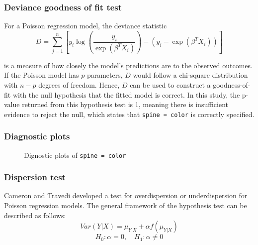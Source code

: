 \documentclass[a4paper, 12pt]{article}
\begin{document}
\subsubsection{Deviance goodness of fit test}
\noindent For a Poisson regression model, the deviance statistic 
$$ D = \sum_{j=1}^{n}[y_i\log(\frac{y_i}{\exp(\beta^T{X_i})}) - (y_i - \exp(\beta^T{X_i}))] $$

\noindent is a measure of how closely the model's predictions are to the observed outcomes. If the Poisson model has $p$ parameters, $D$ would follow a chi-square distribution with $n-p$ degrees of freedom. Hence, $D$ can be used to construct a goodness-of-fit with the null hypothesis that the fitted model is correct.
In this study, the p-value returned from this hypothesis test is 1, meaning there is insufficient evidence to reject the null, which states that \texttt{spine = color} is correctly specified.

\subsubsection{Diagnostic plots}
\begin{figure}[H]
    \centering
    \qquad
    \caption{Dignostic plots of \texttt{spine = color}}
    \label{disgnostic-plots}
\end{figure}

\subsubsection{Dispersion test}
\noindent Cameron and Travedi \cite{cameron_trivedi_1990} developed a test for overdispersion or underdispersion for Poisson regression models. The general framework of the hypothesis test can be described as follows:
$$ Var(Y|X) = \mu_{Y|X} + \alpha f(\mu_{Y|X})$$
$$ H_0: \alpha = 0, \quad H_1: \alpha \neq 0$$
\end{document}
